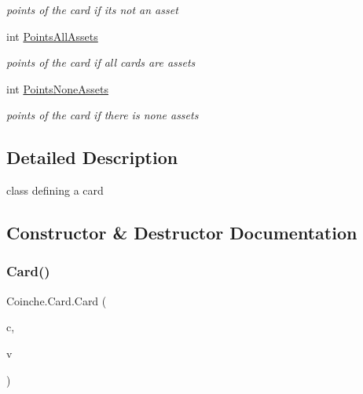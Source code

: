 \begin{DoxyCompactItemize}
\begin{DoxyCompactList}\small\item\em points of the card if it\textquotesingle{}s not an asset \end{DoxyCompactList}\item 
int \hyperlink{class_coinche_1_1_card_ad9c940b967ccd302b1f210fa07c09315}{Points\+All\+Assets}
\begin{DoxyCompactList}\small\item\em points of the card if all cards are assets \end{DoxyCompactList}\item 
int \hyperlink{class_coinche_1_1_card_ac33c19e7a4f0a5fd3112daed9266bf6c}{Points\+None\+Assets}
\begin{DoxyCompactList}\small\item\em points of the card if there is none assets \end{DoxyCompactList}\end{DoxyCompactItemize}


\subsection{Detailed Description}
class defining a card 



\subsection{Constructor \& Destructor Documentation}
\mbox{\label{class_coinche_1_1_card_a9605eece142f74828e18131057a3d180}} 
\subsubsection{\texorpdfstring{Card()}{Card()}}
{\footnotesize\ttfamily Coinche.\+Card.\+Card (\begin{DoxyParamCaption}\item[{Card\+Color}]{c,  }\item[{Card\+Value}]{v }\end{DoxyParamCaption})\hspace{0.3cm}{\ttfamily [inline]}}



